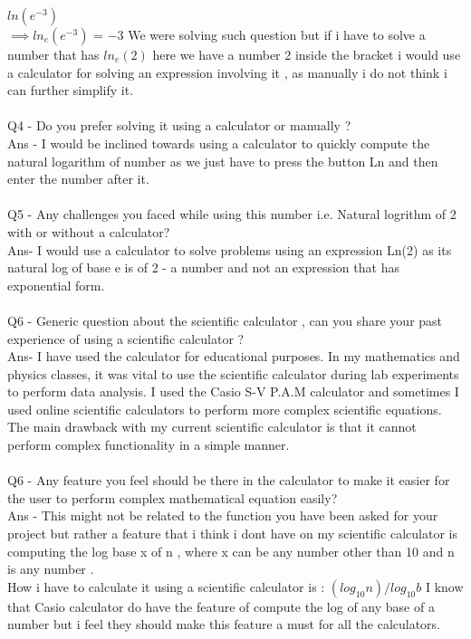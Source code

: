 \documentclass{article}
\begin{document}
$ln (e^{-3})$ \\
$\implies ln_e(e^{-3})$ = $-3$
We were solving such question but if i have to solve a number that has  
$ln_e(2)$  here we have a number 2 inside the bracket i would use a calculator for solving an expression involving it , as manually i do not think i can further simplify it.\\
\\
Q4 - Do you prefer solving it using a calculator or manually ?\\
Ans - I would be inclined towards using a calculator to quickly compute the natural logarithm of number as we just have to press the button Ln and then enter the number after it.\\
\\
Q5 - Any challenges you faced while using this number i.e. Natural logrithm of 2 with or without a calculator?\\
Ans- I would use a calculator to solve problems using an expression Ln(2) as its  natural log of base e is of 2 - a number and not an expression that has exponential form.\\
\\
Q6 - Generic question about the scientific calculator , can you share your past experience of using a scientific calculator ?\\
Ans- I have used the calculator for educational purposes. In my mathematics and physics classes, it was vital to use the scientific calculator during lab experiments to perform data analysis. I used the Casio S-V P.A.M calculator and sometimes I used online scientific calculators to perform more complex scientific equations. The main drawback with my current scientific calculator is that it cannot perform complex functionality in a simple manner.\\
\\
Q6 - Any feature you feel should be there in the calculator to make it easier for the user to perform complex mathematical equation easily?\\

Ans - This might not be related to the function you have been asked for your project but rather a feature that i think i dont have on my scientific calculator is computing the log base x of n , where x can be any number other than 10 and n is any number . \\
How i have to calculate it using a scientific calculator is : 
 $(log_{10} n ) / log_{10} b$ 
I know that Casio calculator do have the feature of compute the log of any base of a number but i feel they should make this feature a must for all the calculators.\\ 
\end{document}
